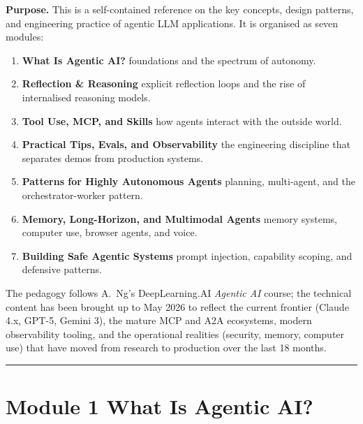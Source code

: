 \documentclass[a4paper,11pt]{article}
\newcommand{\accentrule}{\textcolor{accent}{\rule{40pt}{2.5pt}}}
\begin{document}
\begin{callout}
\textbf{Purpose.}
This is a self-contained reference on the key concepts, design
patterns, and engineering practice of agentic LLM applications. It
is organised as seven modules:

\begin{enumerate}[noitemsep, leftmargin=1.4em, topsep=2pt]
  \item \textbf{What Is Agentic AI?} \textemdash{} foundations and the
        spectrum of autonomy.
  \item \textbf{Reflection \& Reasoning} \textemdash{} explicit reflection
        loops and the rise of internalised reasoning models.
  \item \textbf{Tool Use, MCP, and Skills} \textemdash{} how agents
        interact with the outside world.
  \item \textbf{Practical Tips, Evals, and Observability} \textemdash{}
        the engineering discipline that separates demos from
        production systems.
  \item \textbf{Patterns for Highly Autonomous Agents} \textemdash{}
        planning, multi-agent, and the orchestrator-worker pattern.
  \item \textbf{Memory, Long-Horizon, and Multimodal Agents}
        \textemdash{} memory systems, computer use, browser agents,
        and voice.
  \item \textbf{Building Safe Agentic Systems} \textemdash{} prompt
        injection, capability scoping, and defensive patterns.
\end{enumerate}

\medskip
The pedagogy follows A.\ Ng's DeepLearning.AI \textit{Agentic AI}
course; the technical content has been brought up to May 2026 to
reflect the current frontier (Claude 4.x, GPT-5, Gemini 3), the
mature MCP and A2A ecosystems, modern observability tooling, and the
operational realities (security, memory, computer use) that have
moved from research to production over the last 18 months.
\end{callout}

\vspace{0.5em}
\hfill\accentrule

\section{Module 1 \textemdash{} What Is Agentic AI?}
\end{document}
